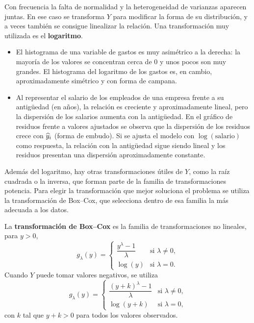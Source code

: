 Con frecuencia la falta de normalidad y la heterogeneidad de varianzas aparecen juntas. En ese
caso se transforma $Y$ para modificar la forma de su distribución, y a veces también se consigue
linealizar la relación. Una transformación muy utilizada es el \textbf{logaritmo}.

\begin{ejemplo}
  \begin{itemize}
    \item El histograma de una variable de gastos es muy asimétrico a la derecha: la mayoría de
      los valores se concentran cerca de 0 y unos pocos son muy grandes. El histograma del
      logaritmo de los gastos es, en cambio, aproximadamente simétrico y con forma de campana.
    \item Al representar el salario de los empleados de una empresa frente a su antigüedad (en
      años), la relación es creciente y aproximadamente lineal, pero la dispersión de los
      salarios aumenta con la antigüedad. En el gráfico de residuos frente a valores ajustados se
      observa que la dispersión de los residuos crece con $\widehat{y}_i$ (forma de embudo). Si se
      ajusta el modelo con $\log(\text{salario})$ como respuesta, la relación con la antigüedad
      sigue siendo lineal y los residuos presentan una dispersión aproximadamente constante.
  \end{itemize}
\end{ejemplo}

Además del logaritmo, hay otras transformaciones útiles de $Y$, como la raíz cuadrada o la
inversa, que forman parte de la familia de transformaciones potencia. Para elegir la
transformación que mejor soluciona el problema se utiliza la transformación de Box--Cox, que
selecciona dentro de esa familia la más adecuada a los datos.

\begin{definicion}
  La \textbf{transformación de Box--Cox} es la familia de transformaciones no lineales, para
  $y>0$,
  \[
    g_\lambda(y) =
    \begin{cases}
      \dfrac{y^\lambda-1}{\lambda} & \text{si } \lambda\neq0, \\[8pt]
      \log(y) & \text{si } \lambda=0 .
    \end{cases}
  \]
  Cuando $Y$ puede tomar valores negativos, se utiliza
  \[
    g_\lambda(y) =
    \begin{cases}
      \dfrac{(y+k)^\lambda-1}{\lambda} & \text{si } \lambda\neq0, \\[8pt]
      \log(y+k) & \text{si } \lambda=0 ,
    \end{cases}
  \]
  con $k$ tal que $y+k>0$ para todos los valores observados.
\end{definicion}


